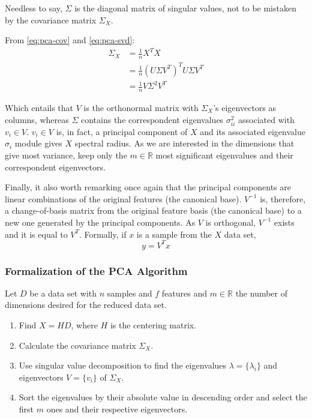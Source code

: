 \documentclass[12pt]{article}
\begin{document}
Needless to say, $\Sigma$ is the diagonal matrix of singular values, not to be mistaken by the covariance matrix $\Sigma_X$.

From \ref{eq:pca-cov} and \ref{eq:pca-svd}:
\begin{align*}
	\Sigma_X &= \frac{1}{n} X^TX \\
	&= \frac{1}{n} (U\Sigma V^T)^TU\Sigma V^T \\
	&= \frac{1}{n} V\Sigma^2 V^T
\end{align*}

Which entails that $V$ is the orthonormal matrix with $\Sigma_X$'s eigenvectors as columns, whereas $\Sigma$ contains the correspondent eigenvalues $\sigma_{ii}^2$ associated with $v_i\in V$. $v_i\in V$ is, in fact, a principal component of $X$ and its associated eigenvalue $\sigma_i$ module gives $X$ spectral radius. As we are interested in the dimensions that give most variance, keep only the $m\in\mathbb{R}$ most significant eigenvalues and their correspondent eigenvectors.

Finally, it also worth remarking once again that the principal components are linear combinations of the original features (the canonical base). $V^{-1}$ is, therefore, a change-of-basis matrix from the original feature basis (the canonical base) to a new one generated by the principal components. As $V$ is orthogonal, $V^{-1}$ exists and it is equal to $V^T$. Formally, if $x$ is a sample from the $X$ data set,
$$y = V^Tx$$

\subsubsection{Formalization of the PCA Algorithm}

Let $D$ be a data set with $n$ samples and $f$ features and $m\in\mathbb{R}$ the number of dimensions desired for the reduced data set. \cite{pca2002} \cite{pcapy}

\begin{enumerate}
	\item Find $X=HD$, where $H$ is the centering matrix.

	\item Calculate the covariance matrix $\Sigma_X$.

	\item Use singular value decomposition to find the eigenvalues $\lambda = \{\lambda_i\}$ and eigenvectors $V = \{v_i\}$ of $\Sigma_X$.

	\item Sort the eigenvalues by their absolute value in descending order and select the first $m$ ones and their respective eigenvectors.
\end{enumerate}
\end{document}
